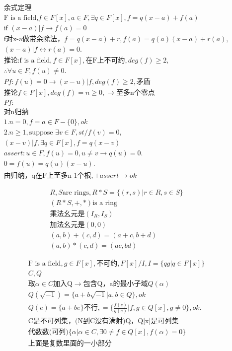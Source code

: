 \documentclass[12pt, a4paper]{article}  %
\begin{document}
\begin{align}
    &\text{余式定理}\\
    &\text{F is a field,}f\in F[x],a\in F,\exists q\in F[x],f=q(x-a)+f(a)\\
    &\text{if }(x-a)|f\rightarrow   f(a)=0\\
    & \text{f对x-a做带余除法，}f=q(x-a)+r,f(a)=q(a)(x-a)+r(a),\\
    &(x-a)|f\leftrightarrow r(a)=0.\\
    &\text{推论:f is a field},f\in F[x],\text{在F上不可约},deg(f)\geqslant 2,\\
    &\therefore\forall u\in F,f(u)\neq 0.\\
    &Pf:f(u)=0\rightarrow(x-u)|f,deg(f)\geqslant 2,\text{矛盾}\\
    &\text{推论}f\in F[x],deg(f)=n\geqslant 0,\rightarrow\text{至多n个零点}\\
    &Pf:\\
    &\text{对n归纳}\\
    &1.n=0,f=a\in F-\{0\},ok\\
    &2.n\geqslant 1,\text{suppose }\exists v\in F,st/f(v)=0,\\
    &(x-v)|f,\exists q\in F[x],f=q(x-v)\\
    &assert:u\in F,f(u)=0,u\neq v\rightarrow q(u)=0.\\
    &0=f(u)=q(u)(x-u).\\
    &\text{由归纳，q在F上至多n-1个根},+assert \rightarrow ok 
\end{align}

\begin{align}
    &R,S\text{are rings},R*S=\{(r,s)|r\in R,s\in S\}\\
    &(R*S,+,*)\text{is a ring}\\
    &\text{乘法幺元是}(I_R,I_S)\\
    &\text{加法幺元是}(0,0)\\
    &(a,b)+(c,d)=(a+c,b+d)\\
    &(a,b)*(c,d)=(ac,bd)
\end{align}

\begin{align}
    &\text{F is a field},g\in F[x],\text{不可约},F[x]/I,I=\{qg|q\in F[x]\}\\
    &C,Q\\
    &\text{取}\alpha \in C\text{加入Q}\rightarrow \text{包含Q，a的最小子域}Q(\alpha)\\
    &Q(\sqrt{-1})=\{a+b\sqrt{-1}|a,b\in Q\},ok\\
    &Q(e)=\{a+be\}\text{不行},=\{\frac{f(e)}{g(e)}|f,g\in Q[x],g\neq 0\},ok.\\
    &\text{C是不可列集，(N到C没有满射)Q，Q[x]是可列集}\\
    &\text{代数数(可列)}\{\alpha|\alpha \in C,\exists 0\neq f\in Q[x],f(\alpha)=0\}\\
    &\text{上面是复数里面的一小部分}
\end{align}
\end{document}
